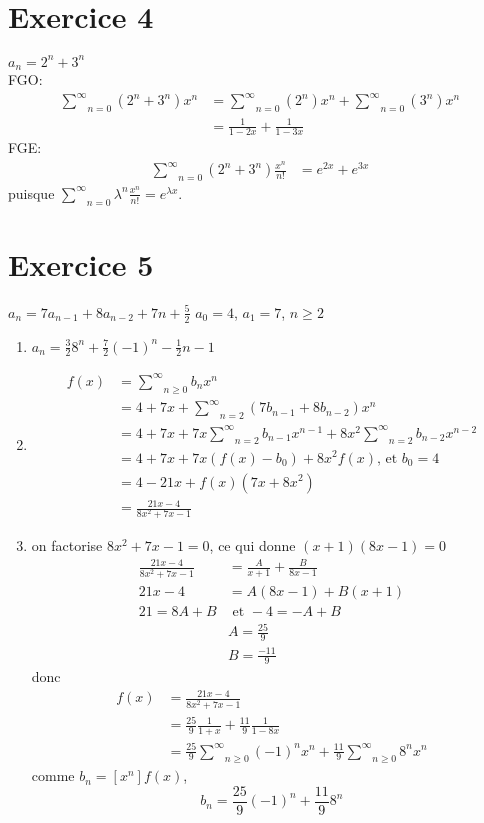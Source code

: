 \documentclass[fontsize=10pt]{article}
\newcommand\tab[1][1cm]{\hspace*{#1}}
\begin{document}
\section*{Exercice 4}
$a_n = 2^n + 3^n$\\
FGO:
\begin{align*}
\underset{n=0}{\overset{\infty}{\sum}} (2^n + 3^n)x^n &= \underset{n=0}{\overset{\infty}{\sum}} (2^n)x^n + \underset{n=0}{\overset{\infty}{\sum}} (3^n)x^n\\
&= \frac{1}{1-2x} + \frac{1}{1-3x}
\end{align*}
FGE:
\begin{align*}
\underset{n=0}{\overset{\infty}{\sum}} (2^n + 3^n)\frac{x^n}{n!} &= e^{2x} + e^{3x}
\end{align*}
puisque $\underset{n=0}{\overset{\infty}{\sum}} \lambda^n \frac{x^n}{n!} = e^{\lambda x}$.
\section*{Exercice 5}
$a_n = 7a_{n-1} + 8a_{n-2} + 7n + \frac{5}{2}$ \tab$a_0=4$, $a_1=7$, $n\geq2$
\begin{enumerate}
\item
$a_n = \frac{3}{2}8^n + \frac{7}{2}(-1)^n - \frac{1}{2}n - 1$
\item
\begin{align*}
f(x) &= \underset{n \geq 0}{\overset{\infty}{\sum}} b_n x^n\\
&= 4 + 7x + \underset{n=2}{\overset{\infty}{\sum}} (7b_{n-1} + 8b_{n-2})x^n\\
&= 4 + 7x + 7x\underset{n=2}{\overset{\infty}{\sum}} b_{n-1}x^{n-1} + 8x^2 \underset{n=2}{\overset{\infty}{\sum}} b_{n-2}x^{n-2}\\
&=4 + 7x + 7x(f(x) - b_0) + 8x^2f(x) \text{, et } b_0 = 4\\
&=4 - 21x + f(x)(7x + 8x^2)\\
&= \frac{21x - 4}{8x^2 + 7x -1}
\end{align*}
\item
on factorise $8x^2 + 7x -1 = 0$, ce qui donne $(x+1)(8x-1)=0$
\begin{align*}
\frac{21x - 4}{8x^2 + 7x -1} &= \frac{A}{x+1} + \frac{B}{8x - 1}\\
21x - 4 &= A(8x -1) + B(x + 1)\\
21 = 8A + B &\text{ et } -4 = -A + B\\
&A = \frac{25}{9}\\
&B = \frac{-11}{9}
\end{align*}
donc
\begin{align*}
f(x) &= \frac{21x - 4}{8x^2 + 7x - 1}\\
&= \frac{25}{9}\frac{1}{1+x} + \frac{11}{9}\frac{1}{1 - 8x}\\
&= \frac{25}{9}\underset{n \geq 0}{\overset{\infty}{\sum}} (-1)^n x^n + \frac{11}{9}\underset{n \geq 0}{\overset{\infty}{\sum}} 8^n x^n
\end{align*}
comme $b_n = [x^n]f(x)$,\\
$$b_n = \frac{25}{9}(-1)^n + \frac{11}{9}8^n$$
\end{enumerate}
\end{document}
